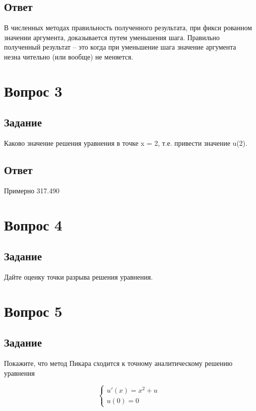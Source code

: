 \documentclass[a4paper,14pt, unknownkeysallowed]{extreport}
\begin{document}
\subsection{Ответ}
В численных методах правильность полученного результата, при фикси­ рованном значении аргумента, доказывается путем уменьшения шага. Правильно полученный результат -- это когда при уменьшение шага значение аргумента незна­ чительно (или вообще) не меняется.

\section{Вопрос 3}

\subsection{Задание}
Каково значение решения уравнения в точке x = 2, т.е. привести значение u(2).

\subsection{Ответ}
Примерно 317.490

\section{Вопрос 4}

\subsection{Задание}
Дайте оценку точки разрыва решения уравнения.

\section{Вопрос 5}

\subsection{Задание}
Покажите, что метод Пикара сходится к точному аналитическому решению уравнения

\begin{equation}
	{\begin{cases}
			u'(x) = x^2 + u \\
			u(0) = 0
		\end{cases}}
\end{equation}
\end{document}
